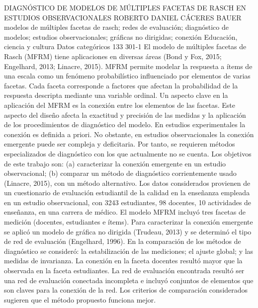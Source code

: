 \A
{DIAGNÓSTICO DE MODELOS DE MÚLTIPLES FACETAS DE RASCH EN ESTUDIOS OBSERVACIONALES}
{ROBERTO DANIEL CÁCERES BAUER}
{
\\
}
{modelos de múltiples facetas de rasch; redes de evaluación; diagnóstico de modelos; estudios observacionales; gráficas no dirigidas; conexión} 
 {Educación, ciencia y cultura} 
 {Datos categóricos} 
 {133} 
 {301-1}
{El modelo de múltiples facetas de Rasch (MFRM) tiene aplicaciones en diversas áreas (Bond y Fox, 2015; Engelhard, 2013; Linacre, 2015). MFRM permite modelar la respuesta a ítems de una escala como un fenómeno probabilístico influenciado por elementos de varias facetas. Cada faceta corresponde a factores que afectan la probabilidad de la respuesta descripta mediante una variable ordinal. Un aspecto clave en la aplicación del MFRM es la conexión entre los elementos de las facetas. Este aspecto del diseño afecta la exactitud y precisión de las medidas y la aplicación de los procedimientos de diagnóstico del modelo. En estudios experimentales la conexión es definida a priori. No obstante, en estudios observacionales la conexión emergente puede ser compleja y deficitaria. Por tanto, se requieren métodos especializados de diagnóstico con los que actualmente no se cuenta. Los objetivos de este trabajo son: (a) caracterizar la conexión emergente en un estudio observacional; (b) comparar un método de diagnóstico corrientemente usado (Linacre, 2015), con un método alternativo. Los datos considerados provienen de un cuestionario de evaluación estudiantil de la calidad en la enseñanza empleada en un estudio observacional, con 3243 estudiantes, 98 docentes, 10 actividades de enseñanza, en una carrera de médico. El modelo MFRM incluyó tres facetas de medición (docentes, estudiantes e ítems). Para caracterizar la conexión emergente se aplicó un modelo de gráfica no dirigida (Trudeau, 2013) y se determinó el tipo de red de evaluación (Engelhard, 1996). En la comparación de los métodos de diagnóstico se consideró: la estabilización de las mediciones; el ajuste global; y las medidas de invarianza. La conexión en la faceta docentes resultó mayor que la observada en la faceta estudiantes. La red de evaluación encontrada resultó ser una red de evaluación conectada incompleta e incluyó conjuntos de elementos que son claves para la conexión de la red. Los criterios de comparación considerados sugieren que el método propuesto funciona mejor.}
